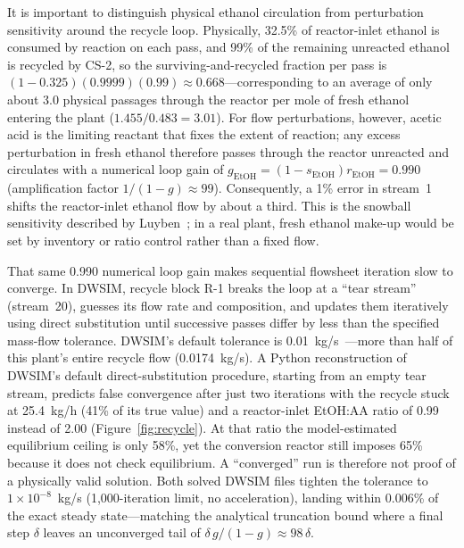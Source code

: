\documentclass[10pt,a4paper]{article}
\begin{document}
It is important to distinguish physical ethanol circulation from perturbation sensitivity around the recycle loop. Physically, 32.5\% of reactor-inlet ethanol is consumed by reaction on each pass, and 99\% of the remaining unreacted ethanol is recycled by CS-2, so the surviving-and-recycled fraction per pass is $(1 - 0.325)(0.9999)(0.99) \approx 0.668$---corresponding to an average of only about 3.0 physical passages through the reactor per mole of fresh ethanol entering the plant ($1.455 / 0.483 = 3.01$). For flow perturbations, however, acetic acid is the limiting reactant that fixes the extent of reaction; any excess perturbation in fresh ethanol therefore passes through the reactor unreacted and circulates with a numerical loop gain of $g_{\mathrm{EtOH}} = (1 - s_{\mathrm{EtOH}})r_{\mathrm{EtOH}} = 0.990$ (amplification factor $1/(1-g) \approx 99$). Consequently, a 1\% error in stream~1 shifts the reactor-inlet ethanol flow by about a third. This is the snowball sensitivity described by Luyben~\cite{ref15}; in a real plant, fresh ethanol make-up would be set by inventory or ratio control rather than a fixed flow.

That same 0.990 numerical loop gain makes sequential flowsheet iteration slow to converge. In DWSIM, recycle block R-1 breaks the loop at a ``tear stream'' (stream~20), guesses its flow rate and composition, and updates them iteratively using direct substitution until successive passes differ by less than the specified mass-flow tolerance. DWSIM's default tolerance is 0.01~kg/s~\cite{ref8}---more than half of this plant's entire recycle flow (0.0174~kg/s). A Python reconstruction of DWSIM's default direct-substitution procedure, starting from an empty tear stream, predicts false convergence after just two iterations with the recycle stuck at 25.4~kg/h (41\% of its true value) and a reactor-inlet EtOH:AA ratio of 0.99 instead of 2.00 (Figure~\ref{fig:recycle}). At that ratio the model-estimated equilibrium ceiling is only 58\%, yet the conversion reactor still imposes 65\% because it does not check equilibrium. A ``converged'' run is therefore not proof of a physically valid solution. Both solved DWSIM files tighten the tolerance to $1 \times 10^{-8}$~kg/s (1,000-iteration limit, no acceleration), landing within 0.006\% of the exact steady state---matching the analytical truncation bound where a final step $\delta$ leaves an unconverged tail of $\delta\,g/(1-g) \approx 98\,\delta$.
\end{document}
